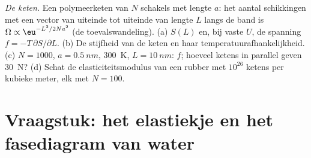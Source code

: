 \begin{exercise}[$\star\star\star$]\label{exo:b2:thermodynamic-potentials:12}
\emph{De keten.} Een polymeerketen van $N$ schakels met lengte $a$: het
aantal schikkingen met een vector van uiteinde tot uiteinde van lengte $L$ langs
de band is $\Omega \propto \eu^{-L^2/2Na^2}$ (de toevalswandeling). (a) $S(L)$
en, bij vaste $U$, de spanning $f = -T\,\partial S/\partial L$. (b) De
stijfheid van de keten en haar temperatuurafhankelijkheid. (c) $N = 1000$,
$a =
\qty{0.5}{nm}$, \qty{300}{K}, $L = \qty{10}{nm}$: $f$; hoeveel ketens
in
parallel geven \qty{30}{N}? (d) Schat de elasticiteitsmodulus van een rubber
met $10^{26}$ ketens per kubieke meter, elk met $N = 100$.
\end{exercise}

\section{Vraagstuk: het elastiekje en het fasediagram van water}

